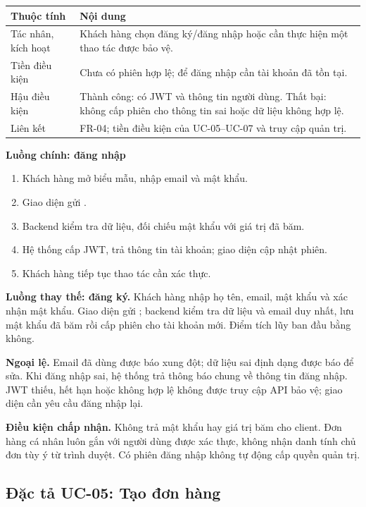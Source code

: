 \begin{longtable}{|p{3.1cm}|p{11.5cm}|}
\hline \textbf{Thuộc tính} & \textbf{Nội dung} \\ \hline
Tác nhân, kích hoạt & Khách hàng chọn đăng ký/đăng nhập hoặc cần thực hiện
một thao tác được bảo vệ. \\ \hline
Tiền điều kiện & Chưa có phiên hợp lệ; để đăng nhập cần tài khoản đã tồn tại. \\ \hline
Hậu điều kiện & Thành công: có JWT và thông tin người dùng. Thất bại:
không cấp phiên cho thông tin sai hoặc dữ liệu không hợp lệ. \\ \hline
Liên kết & FR-04; tiền điều kiện của UC-05--UC-07 và truy cập quản trị. \\ \hline
\end{longtable}

\textbf{Luồng chính: đăng nhập}
\begin{enumerate}[nosep]
  \item Khách hàng mở biểu mẫu, nhập email và mật khẩu.
  \item Giao diện gửi .
  \item Backend kiểm tra dữ liệu, đối chiếu mật khẩu với giá trị đã băm.
  \item Hệ thống cấp JWT, trả thông tin tài khoản; giao diện cập nhật phiên.
  \item Khách hàng tiếp tục thao tác cần xác thực.
\end{enumerate}

\textbf{Luồng thay thế: đăng ký.} Khách hàng nhập họ tên, email, mật khẩu
và xác nhận mật khẩu. Giao diện gửi ;
backend kiểm tra dữ liệu và email duy nhất, lưu mật khẩu đã băm rồi cấp
phiên cho tài khoản mới. Điểm tích lũy ban đầu bằng không.

\textbf{Ngoại lệ.} Email đã dùng được báo xung đột; dữ liệu sai định dạng
được báo để sửa. Khi đăng nhập sai, hệ thống trả thông báo chung về thông
tin đăng nhập. JWT thiếu, hết hạn hoặc không hợp lệ không được truy cập
API bảo vệ; giao diện cần yêu cầu đăng nhập lại.

\textbf{Điều kiện chấp nhận.} Không trả mật khẩu hay giá trị băm cho client.
Đơn hàng cá nhân luôn gắn với người dùng được xác thực, không nhận danh
tính chủ đơn tùy ý từ trình duyệt. Có phiên đăng nhập không tự động cấp
quyền quản trị.

\subsection{Đặc tả UC-05: Tạo đơn hàng}
\label{uc:05}
\label{uc05}

